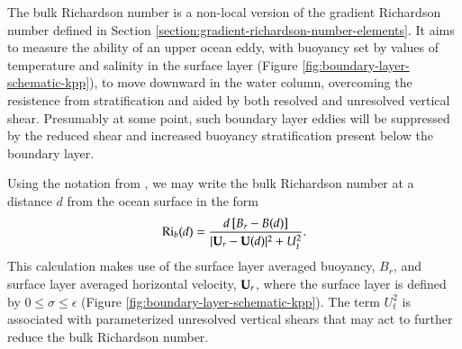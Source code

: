 The bulk Richardson number is a non-local version of the gradient
Richardson number defined in Section
\ref{section:gradient-richardson-number-elements}.  It aims to measure
the ability of an upper ocean eddy, with buoyancy set by values of
temperature and salinity in the surface layer (Figure
\ref{fig:boundary-layer-schematic-kpp}), to move downward in the water
column, overcoming the resistence from stratification and aided by
both resolved and unresolved vertical shear.  Presumably at some
point, such boundary layer eddies will be suppressed by the reduced
shear and increased buoyancy stratification present below the boundary
layer.

Using the notation from \cite{LargeKPP}, we may write the bulk
Richardson number at a distance $d$ from the ocean surface in the form
\begin{equation}
  \mbox{Ri}_{b} (d) = \frac{d \, [B_{r} - B(d) ]}{ |{\bf U}_{r} - {\bf U}(d)|^{2} + U_{t}^{2}}. 
\label{eq:bulk-ri-large-kpp-large-etal-form}
\end{equation}
This calculation makes use of the surface layer averaged buoyancy,
$B_{r}$, and surface layer averaged horizontal velocity, ${\bf
  U}_{r}$, where the surface layer is defined by $0 \le \sigma \le
\epsilon$ (Figure \ref{fig:boundary-layer-schematic-kpp}). The term
$U_{t}^{2}$ is associated with parameterized unresolved vertical
shears that may act to further reduce the bulk Richardson number.

